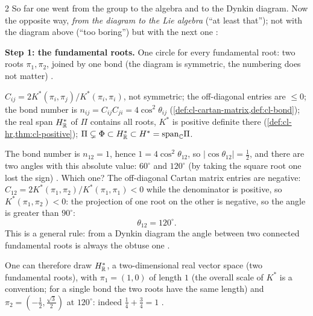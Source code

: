 \begin{paracol}{2}
So far one went from the group to the algebra and to the Dynkin diagram. Now the opposite way, \emph{from the diagram to the Lie algebra} (``at least that''); not with the diagram above (``too boring'') but with the next one   :
\begin{center}
\end{center}
\textbf{Step 1: the fundamental roots.} One circle for every fundamental root: two roots $\pi_1,\pi_2$, joined by one bond (the diagram is symmetric, the numbering does not matter)  .
\begin{recall}
$C_{ij}=2K^*(\pi_i,\pi_j)/K^*(\pi_i,\pi_i)$, not symmetric; the off-diagonal entries are $\le0$; the bond number is $n_{ij}=C_{ij}C_{ji}=4\cos^2\theta_{ij}$ (\cref{def:cl-cartan-matrix,def:cl-bond}); the real span $H^*_{\mathbb{R}}$ of $\Pi$ contains all roots, $K^*$ is positive definite there (\cref{def:cl-hr,thm:cl-positive}); $\Pi\subsetneq\Phi\subset H^*_{\mathbb{R}}\subset H^*=\mathrm{span}_{\mathbb{C}}\Pi$.
\end{recall}
The bond number is $n_{12}=1$, hence $1=4\cos^2\theta_{12}$, so $|\cos\theta_{12}|=\frac12$, and there are two angles with this absolute value: $60^\circ$ and $120^\circ$ (by taking the square root one lost the sign)            . Which one? The off-diagonal Cartan matrix entries are negative: $C_{12}=2K^*(\pi_1,\pi_2)/K^*(\pi_1,\pi_1)<0$ while the denominator is positive, so $K^*(\pi_1,\pi_2)<0$: the projection of one root on the other is negative, so the angle is greater than $90^\circ$:
\[
  \theta_{12}=120^\circ .
\]
This is a general rule: from a Dynkin diagram the angle between two connected fundamental roots is always the obtuse one    .

One can therefore draw $H^*_{\mathbb{R}}$, a two-dimensional real vector space (two fundamental roots), with $\pi_1=(1,0)$ of length $1$ (the overall scale of $K^*$ is a convention; for a single bond the two roots have the same length) and $\pi_2=(-\tfrac12,\tfrac{\sqrt3}2)$ at $120^\circ$: indeed $\tfrac14+\tfrac34=1$    .


\end{paracol}

